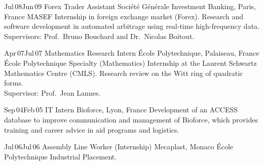 \begin{entrylist}
  \entry
    {Jul\,08\textemdash{}Jun\,09}
    {Forex Trader Assistant}
    {Soci\'{e}t\'{e} G\'{e}n\'{e}rale Investment Banking, Paris, France}
    {MASEF Internship in foreign exchange market (Forex).
    Research and software development in automated arbitrage using real-time high-frequency data.\\
    Supervisors: Prof.~Bruno Bouchard and Dr.~Nicolas Boitout.}

  \entry
    {Apr\,07\textemdash{}Jul\,07}
    {Mathematics Research Intern}
    {\'{E}cole Polytechnique, Palaiseau, France}
    {\'{E}cole Polytechnique Specialty (Mathematics) Internship at the Laurent Schwartz Mathematics Centre (CMLS). Research review on the Witt ring of quadratic forms.\\
    Supervisor: Prof.~Jean Lannes.}

  \entry
    {Sep\,04\textemdash{}Feb\,05}
    {IT Intern}
    {Bioforce, Lyon, France}
    {Development of an ACCESS database to improve communication and management of Bioforce, which provides training and career advice in aid programs and logistics.}

  \entry
    {Jul\,06\textemdash{}Jul\,06}
    {Assembly Line Worker (Internship)}
    {Mecaplast, Monaco}
    {\'Ecole Polytechnique Industrial Placement.}

\end{entrylist}



